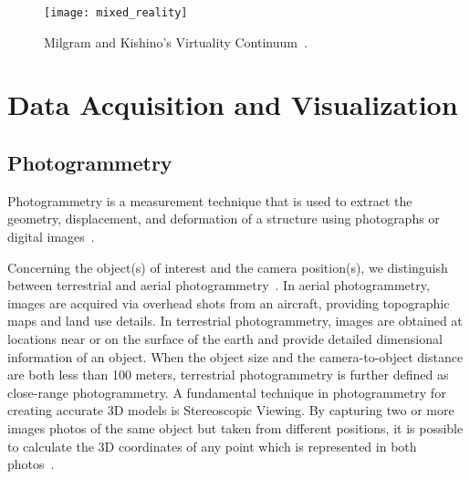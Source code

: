 \begin{figure}[htbp]
    \centering
    \texttt{[image: mixed\_reality]}
    \caption{Milgram and Kishino’s Virtuality Continuum~\cite{milgram1994taxonomy}.}
    \label{fig:mixed_reality} 
\end{figure} 
\FloatBarrier


\section{ Data Acquisition and Visualization}
\label{sec:data}

\subsection{Photogrammetry}
\label{sec:photogrammetry}

Photogrammetry is a measurement technique that is used to extract the geometry, displacement, and deformation of a
structure using photographs or digital images~\cite{Baqersad2017Photogrammetry}.

Concerning the object(s) of interest and the camera position(s), we distinguish
between terrestrial and aerial photogrammetry~\cite{linder2016digital}.
In aerial photogrammetry, images are acquired via overhead shots from an aircraft, providing topographic maps and land use details. In terrestrial photogrammetry, images are obtained at locations near or on the surface of
the earth and provide detailed dimensional information of an object. When the object size and the camera-to-object 
distance are both less than 100 meters, terrestrial photogrammetry is further defined as close-range photogrammetry. A fundamental technique in photogrammetry for creating accurate \gls{3D} models is Stereoscopic Viewing. 
By capturing two or more images photos of the same object but taken from different positions, it is possible to calculate the \gls{3D} coordinates of any point which is represented in both photos~\cite{linder2016digital}. 

